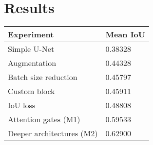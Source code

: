 \documentclass[11pt]{article}
\begin{document}
\begin{multicols}{2}


      \label{sec:results}
      \section{Results}

      \begin{table}[H]
            \label{tab:results}
            \centering
            \setlength{\tabcolsep}{3pt}
            \begin{tabularx}{\linewidth}{lY}
                \toprule
                Experiment & Mean IoU \\
                \midrule
                Simple U-Net & 0.38328 \\
                Augmentation & 0.44328 \\
                Batch size reduction & 0.45797 \\
                Custom block & 0.45911 \\
                IoU loss & 0.48808 \\
                Attention gates (M1) & 0.59533 \\
                Deeper architectures (M2) & 0.62900 \\
                \bottomrule
            \end{tabularx}
      \end{table}


\end{multicols}
\end{document}
